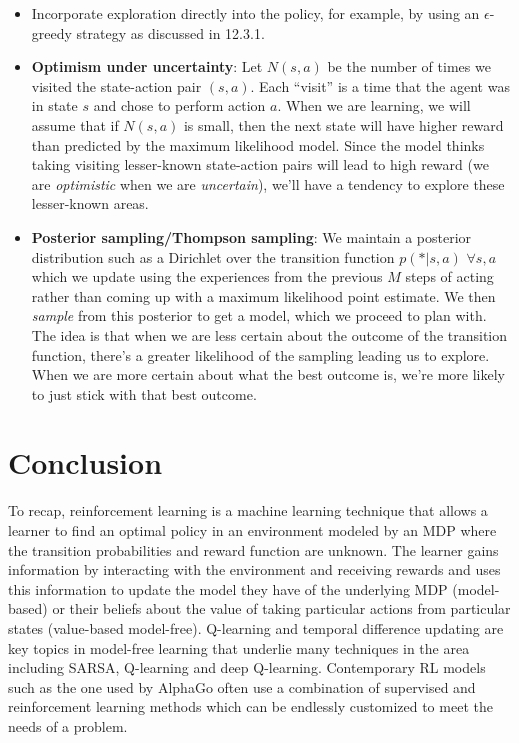 \begin{itemize}
    \item Incorporate exploration directly into the policy, for example, by using an $\epsilon$-greedy strategy as discussed in 12.3.1.
    \item \textbf{Optimism under uncertainty}: Let $N(s,a)$ be the number of times we visited the state-action pair $(s,a)$. Each ``visit” is a time that the agent was in state $s$ and chose to perform action $a$. When we are learning, we will assume that if $N(s,a)$ is small, then the next state will have higher reward than predicted by the maximum likelihood model. Since the model thinks taking visiting lesser-known state-action pairs will lead to high reward (we are \textit{optimistic} when we are \textit{uncertain}), we’ll have a tendency to explore these lesser-known areas.
    \item \textbf{Posterior sampling/Thompson sampling}: We maintain a posterior distribution such as a Dirichlet over the transition function $p(*|s, a)$ $\forall s, a$ which we update using the experiences from the previous $M$ steps of acting rather than coming up with a maximum likelihood point estimate. We then \textit{sample} from this posterior to get a model, which we proceed to plan with. The idea is that when we are less certain about the outcome of the transition function, there’s a greater likelihood of the sampling leading us to explore. When we are more certain about what the best outcome is, we’re more likely to just stick with that best outcome.
\end{itemize}
\section{Conclusion}
To recap, reinforcement learning is a machine learning technique that allows a learner to find an optimal policy in an environment modeled by an MDP where the transition probabilities and reward function are unknown. The learner gains information by interacting with the environment and receiving rewards and uses this information to update the model they have of the underlying MDP (model-based) or their beliefs about the value of taking particular actions from particular states (value-based model-free). Q-learning and temporal difference updating are key topics in model-free learning that underlie many techniques in the area including SARSA, Q-learning and deep Q-learning. Contemporary RL models such as the one used by AlphaGo often use a combination of supervised and reinforcement learning methods which can be endlessly customized to meet the needs of a problem.

